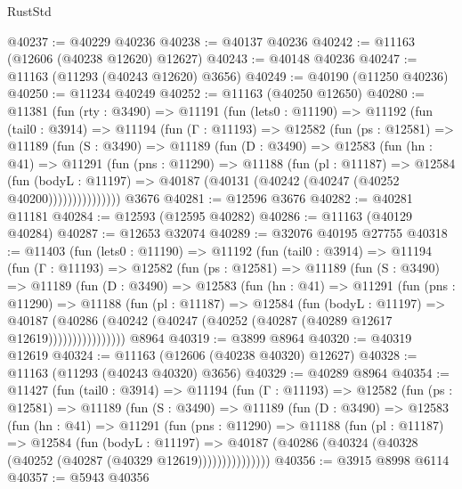 \begin{lexlean}{RustStd}
\begin{coremodule}
@40237 := @40229 @40236
@40238 := @40137 @40236
@40242 := @11163 (@12606 (@40238 @12620) @12627)
@40243 := @40148 @40236
@40247 := @11163 (@11293 (@40243 @12620) @3656)
@40249 := @40190 (@11250 @40236)
@40250 := @11234 @40249
@40252 := @11163 (@40250 @12650)
@40280 := @11381
    (fun (rty : @3490) =>
    @11191
      (fun (lets0 : @11190) =>
      @11192
        (fun (tail0 : @3914) =>
        @11194
          (fun (Γ : @11193) =>
          @12582
            (fun (ps : @12581) =>
            @11189
              (fun (S : @3490) =>
              @11189
                (fun (D : @3490) =>
                @12583
                  (fun (hn : @41) =>
                  @11291
                    (fun (pns : @11290) =>
                    @11188
                      (fun (pl : @11187) =>
                      @12584
                        (fun (bodyL : @11197) =>
                        @40187 (@40131 (@40242 (@40247 (@40252 @40200)))))))))))))))
    @3676
@40281 := @12596 @3676
@40282 := @40281 @11181
@40284 := @12593 (@12595 @40282)
@40286 := @11163 (@40129 @40284)
@40287 := @12653 @32074
@40289 := @32076 @40195 @27755
@40318 := @11403
    (fun (lets0 : @11190) =>
    @11192
      (fun (tail0 : @3914) =>
      @11194
        (fun (Γ : @11193) =>
        @12582
          (fun (ps : @12581) =>
          @11189
            (fun (S : @3490) =>
            @11189
              (fun (D : @3490) =>
              @12583
                (fun (hn : @41) =>
                @11291
                  (fun (pns : @11290) =>
                  @11188
                    (fun (pl : @11187) =>
                    @12584
                      (fun (bodyL : @11197) =>
                      @40187
                        (@40286
                          (@40242 (@40247 (@40252 (@40287 (@40289 @12617 @12619))))))))))))))))
    @8964
@40319 := @3899 @8964
@40320 := @40319 @12619
@40324 := @11163 (@12606 (@40238 @40320) @12627)
@40328 := @11163 (@11293 (@40243 @40320) @3656)
@40329 := @40289 @8964
@40354 := @11427
    (fun (tail0 : @3914) =>
    @11194
      (fun (Γ : @11193) =>
      @12582
        (fun (ps : @12581) =>
        @11189
          (fun (S : @3490) =>
          @11189
            (fun (D : @3490) =>
            @12583
              (fun (hn : @41) =>
              @11291
                (fun (pns : @11290) =>
                @11188
                  (fun (pl : @11187) =>
                  @12584
                    (fun (bodyL : @11197) =>
                    @40187 (@40286 (@40324 (@40328 (@40252 (@40287 (@40329 @12619)))))))))))))))
@40356 := @3915 @8998 @6114
@40357 := @5943 @40356

\end{coremodule}
\end{lexlean}
